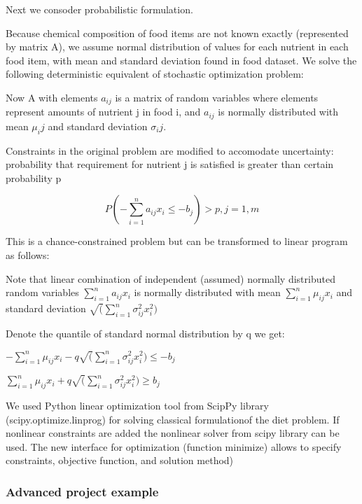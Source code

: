 Next we consoder probabilistic formulation.

Because chemical composition of food items are not known exactly (represented by matrix A), we assume normal distribution of values for each nutrient in each food item, with mean and standard deviation found in food dataset. We solve the following deterministic equivalent of stochastic optimization problem:

Now A with elements $a_{ij}$ is a matrix of random variables where elements represent amounts of nutrient j in food i, and $a_{ij}$ is normally distributed with mean $\mu_ij$ and standard deviation $\sigma_ij$. 


Constraints in the original problem are modified to accomodate uncertainty: probability that requirement for nutrient j is satisfied is greater than certain probability p 

   \begin{equation} %
  P(  -\sum_{i=1}^{n}{a_{ij}x_i}\le - b_j) >p, j=1,m
    \end{equation}

This is a chance-constrained problem but can be transformed to linear program as follows:

Note that linear combination  of independent (assumed) normally distributed random variables $\sum_{i=1}^{n}{a_{ij}x_i}$ is normally distributed with mean  $\sum_{i=1}^{n}{\mu_{ij}x_i}$  and standard deviation  $\sqrt (\sum_{i=1}^{n}{\sigma_{ij}^2x_i^2})$ 

Denote the quantile of standard normal distribution by q we get:

$-\sum_{i=1}^{n}{\mu_{ij}x_i}-q \sqrt (\sum_{i=1}^{n}{\sigma_{ij}^2x_i^2}) \le -b_j$ 

$\sum_{i=1}^{n}{\mu_{ij}x_i}+q \sqrt (\sum_{i=1}^{n}{\sigma_{ij}^2x_i^2}) \ge b_j$ 


We used Python linear optimization tool  from ScipPy library (scipy.optimize.linprog) for solving classical formulationof the diet problem. If nonlinear constraints are added the nonlinear solver from scipy library can be used. The new interface for optimization (function minimize) allows to specify constraints, objective function, and solution method)

      \subsubsection{Advanced project example \label{advannced project example} }

